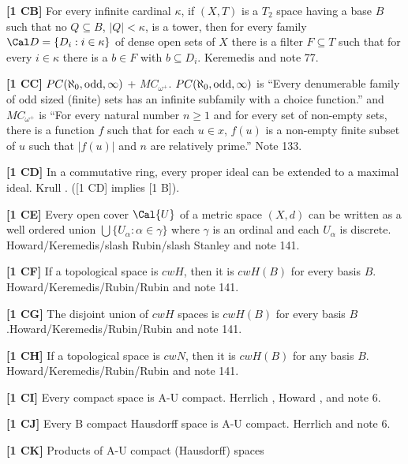 \smallskip
\item{}{\bf [1 CB]} For every infinite cardinal $\kappa$, if $(X,T)$ is
a $T_2$ space having a base $B$ such that no $Q\subseteq B$, $|Q| <
\kappa$, is a tower, then for every family $\Cal D=\{D_i:i\in\kappa\}$
of dense open sets of $X$ there is a filter $F\subseteq T$ such that
for every $i\in\kappa$ there  is a $b\in F$ with $b\subseteq D_i$.
\ac{Keremedis} \cite{1998a} and note 77.
\smallskip
\item{}{\bf [1 CC]}  $PC(\aleph_0,\hbox{odd},\infty)$ +
$MC_{\omega^+}$. $PC(\aleph_0,\hbox{odd},\infty)$ is
``Every denumerable family of odd sized (finite) sets has an
infinite subfamily with a choice function.'' and $MC_{\omega^+}$
is ``For every natural number $n \ge 1$ and for
every set of non-empty sets, there is a function $f$ such that for
each $u\in x$, $f(u)$ is a non-empty finite subset of $u$  such
that $|f(u)|$ and $n$ are relatively prime.'' Note  133.
\smallskip
\item{}{\bf [1 CD]} In a commutative ring, every proper ideal can be
extended to a maximal ideal. \ac{Krull} \cite{1929}. ([1 CD] implies [1 B]).
\smallskip
\item{}{\bf [1 CE]} Every open cover $\Cal{U}$ of a metric space $(X,d)$
can be written as a well ordered union $\bigcup\{U_\alpha :
\alpha\in\gamma\}$ where $\gamma$ is an ordinal and each $U_\alpha$ is
discrete. \ac{Howard/Keremedis/slash Rubin/slash Stanley} \cite{1999} and
note 141.
\smallskip
\item{}{\bf [1 CF]} If a topological space is $cwH$, then it is $cwH(B)$
for every basis $B$. \ac{Howard/Keremedis/Rubin/Rubin} \cite{1998b}
and note 141.
\smallskip
\item{}{\bf [1 CG]} The disjoint union of $cwH$ spaces is $cwH(B)$
for every basis $B$.\newline \ac{Howard/Keremedis/Rubin/Rubin}
\cite{1998b} and note 141.
\smallskip
\item{}{\bf [1 CH]} If a topological space is $cwN$, then it is $cwH(B)$
for any basis $B$. \ac{Howard/Keremedis/Rubin/Rubin} \cite{1998b}
and note 141.
\smallskip
\item{}{\bf [1 CI]} Every compact space is A-U compact.  \ac{Herrlich}
\cite{1996a}, \ac{Howard} \cite{1990}, and note 6.
\smallskip
\item{}{\bf [1 CJ]} Every B compact Hausdorff space is A-U compact.
\ac{Herrlich} \cite{1996a} and note 6.
\smallskip
\item{}{\bf [1 CK]} Products of A-U compact (Hausdorff) spaces
